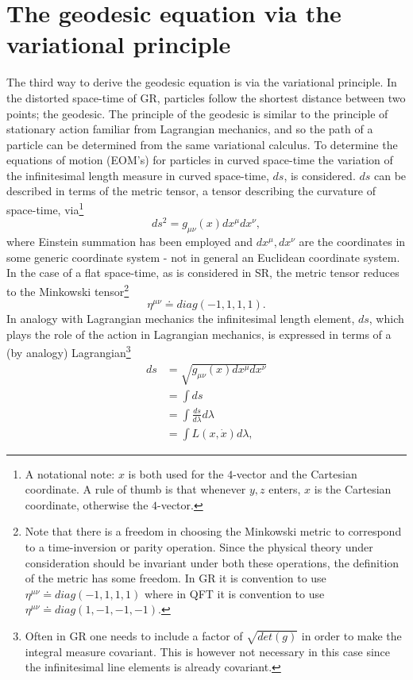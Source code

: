 \section{The geodesic equation via the variational principle}
The third way to derive the geodesic equation is via the variational principle. In the distorted space-time of GR,
particles follow the shortest distance between
two points; the geodesic. The principle of the geodesic is similar to the principle of stationary action familiar from Lagrangian mechanics, and so the path of a particle can be determined from the same variational calculus. To determine the equations of motion (EOM's) for particles in curved space-time the variation of the infinitesimal length measure in curved space-time, $ds$, is considered. $ds$ can be described in terms of the metric tensor, a tensor describing the curvature of space-time, via\footnote{A notational note: $x$ is both used for the $4$-vector and the Cartesian coordinate. A rule of thumb is that whenever $y,z$ enters, $x$ is the Cartesian coordinate, otherwise the $4$-vector.}
\begin{equation}
	ds^2=g_{\mu\nu}(x)dx^\mu dx^\nu,
\end{equation} 
where Einstein summation has been employed and $dx^{\mu}, dx^{\nu}$ are the coordinates in some generic coordinate system - not in general an Euclidean coordinate system. In the case of a flat space-time, as is considered in SR, the metric tensor reduces to the Minkowski tensor\footnote{Note that there is a freedom in choosing the Minkowski metric to correspond to a time-inversion or parity operation. Since the physical theory under consideration should be invariant under both these operations, the definition of the metric has some freedom. In GR it is convention to use $\eta^{\mu\nu}\doteq diag(-1,1,1,1)$ where in QFT it is convention to use $\eta^{\mu\nu}\doteq diag(1,-1,-1,-1)$.}
\begin{equation}
	\eta^{\mu\nu}\doteq diag(-1,1,1,1).
\end{equation} 
In analogy with Lagrangian mechanics the infinitesimal length element, $ds$, which plays the role of the action in Lagrangian mechanics, is expressed in terms of a (by analogy) Lagrangian\footnote{Often in GR one needs to include a factor of $\sqrt{det(g)}$ in order to make the integral measure covariant. This is however not necessary in this case since the infinitesimal line elements is already covariant.}
\begin{equation}
	\begin{split}
		ds&=\sqrt{g_{\mu\nu}(x)dx^\mu dx^\nu}\\
		&=\int ds\\
		&=\int \frac{ds}{d\lambda}d\lambda\\
		&=\int L(x,\dot x) d\lambda,
	\end{split}
\end{equation} 
